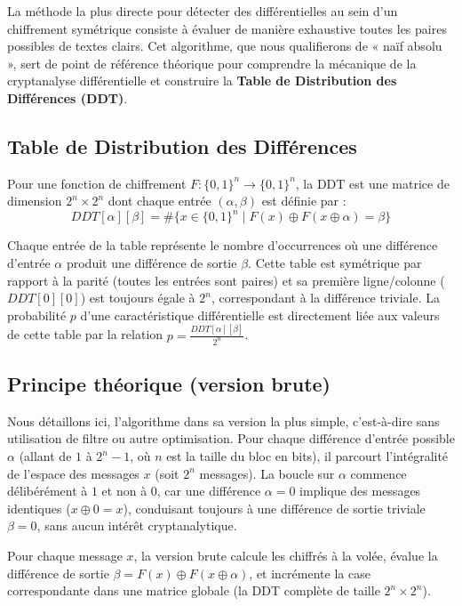 \documentclass[a4paper,11pt]{article}
\begin{document}
La méthode la plus directe pour détecter des différentielles au sein d'un chiffrement symétrique consiste à évaluer de manière exhaustive toutes les paires possibles de textes clairs. Cet algorithme, que nous qualifierons de « naïf absolu », sert de point de référence théorique pour comprendre la mécanique de la cryptanalyse différentielle et construire la \textbf{Table de Distribution des Différences (DDT)}.

\subsection*{Table de Distribution des Différences}
Pour une fonction de chiffrement $F : \{0,1\}^n \to \{0,1\}^n$, la DDT est une matrice de dimension $2^n \times 2^n$ dont chaque entrée $(\alpha, \beta)$ est définie par :
$$DDT[\alpha][\beta] = \#\{x \in \{0,1\}^n \mid F(x) \oplus F(x \oplus \alpha) = \beta\}$$

Chaque entrée de la table représente le nombre d'occurrences où une différence d'entrée $\alpha$ produit une différence de sortie $\beta$. Cette table est symétrique par rapport à la parité (toutes les entrées sont paires) et sa première ligne/colonne ($DDT[0][0]$) est toujours égale à $2^n$, correspondant à la différence triviale. La probabilité $p$ d'une caractéristique différentielle est directement liée aux valeurs de cette table par la relation $p = \frac{DDT[\alpha][\beta]}{2^n}$.

\subsection{Principe théorique (version brute)}
Nous détaillons ici, l'algorithme dans sa version la plus simple, c'est-à-dire sans utilisation de filtre ou autre optimisation. Pour chaque différence d'entrée possible $\alpha$ (allant de $1$ à $2^n - 1$, où $n$ est la taille du bloc en bits), il parcourt l'intégralité de l'espace des messages $x$ (soit $2^n$ messages). La boucle sur $\alpha$ commence délibérément à $1$ et non à $0$, car une différence $\alpha = 0$ implique des messages identiques ($x \oplus 0 = x$), conduisant toujours à une différence de sortie triviale $\beta = 0$, sans aucun intérêt cryptanalytique.

Pour chaque message $x$, la version brute calcule les chiffrés à la volée, évalue la différence de sortie $\beta = F(x) \oplus F(x \oplus \alpha)$, et incrémente la case correspondante dans une matrice globale (la DDT complète de taille $2^n \times 2^n$).
\end{document}
